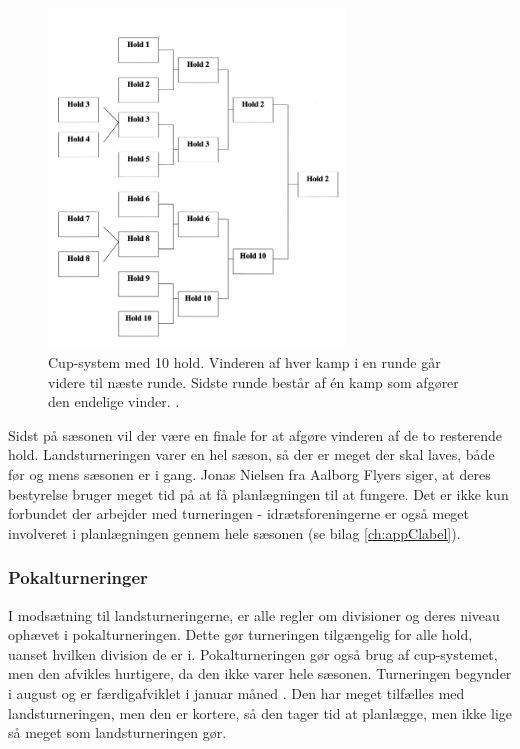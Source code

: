 \begin{figure}[H]
  \centering
  \includegraphics[width=0.7\textwidth]{figures/cup-spil.png}
  \caption{Cup-system med 10 hold. Vinderen af hver kamp i en runde går videre til næste runde. Sidste runde består af én kamp som afgører den endelige vinder. 
  \citep{staevnemappe}. }
  \label{fig:cup-spil}
\end{figure}

Sidst på sæsonen vil der være en finale for at afgøre vinderen af de to resterende hold. Landsturneringen varer en hel sæson, så der er meget der skal laves, både før og mens sæsonen er i gang. Jonas Nielsen fra Aalborg Flyers siger, at deres bestyrelse bruger meget tid på at få planlægningen til at fungere. Det er ikke kun forbundet der arbejder med turneringen - idrætsforeningerne er også meget involveret i planlægningen gennem hele sæsonen (se bilag \ref{ch:appClabel}). %

\subsubsection{Pokalturneringer}
I modsætning til landsturneringerne, er alle regler om divisioner og deres niveau ophævet i pokalturneringen. Dette gør turneringen tilgængelig for alle hold, uanset hvilken division de er i. Pokalturneringen gør også brug af cup-systemet, men den afvikles hurtigere, da den ikke varer hele sæsonen. Turneringen begynder i august og er færdigafviklet i januar måned \cite{Pokalturnering}. Den har meget tilfælles med landsturneringen, men den er kortere, så den tager tid at planlægge, men ikke lige så meget som landsturneringen gør.


